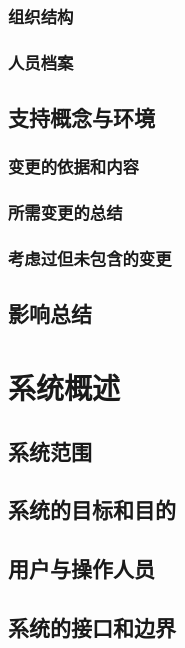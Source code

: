 \documentclass{ctexart}
\begin{document}
\subsubsection{组织结构}

\subsubsection{人员档案}

\subsection{支持概念与环境}

\subsubsection{变更的依据和内容}

\subsubsection{所需变更的总结}

\subsubsection{考虑过但未包含的变更}

\subsection{影响总结}

\newpage
\section{系统概述}

\subsection{系统范围}

\subsection{系统的目标和目的}

\subsection{用户与操作人员}

\subsection{系统的接口和边界}
\end{document}
